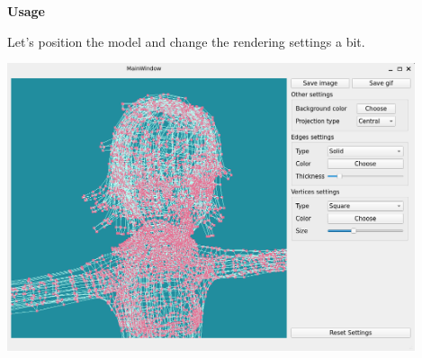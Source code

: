 \documentclass[12pt, letterpaper
]{article}
\begin{document}
\textbf{Usage}

Let's position the model and change the rendering settings a bit.

\includegraphics[width=4.72361in,height=3.32986in]{vertopal_4bce193b52fb40a8bfdc292270c39a64/media/image4.png}
\end{document}
